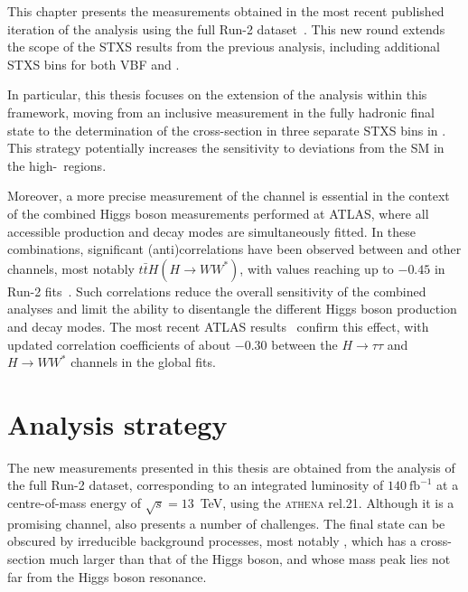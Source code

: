 This chapter presents the measurements obtained in the most recent published iteration of the \htautau analysis using the full Run-2 dataset~\cite{differential_htautau}. This new round extends the scope of the STXS results from the previous analysis, including additional STXS bins for both VBF and \ttH.  

In particular, this thesis focuses on the extension of the \ttH analysis within this framework, moving from an inclusive measurement in the fully hadronic final state to the determination of the cross-section in three separate STXS bins in \pth. This strategy potentially increases the sensitivity to deviations from the SM in the high-\pt\ regions.  

Moreover, a more precise measurement of the \ttHtt channel is essential in the context of the combined Higgs boson measurements performed at ATLAS, where all accessible production and decay modes are simultaneously fitted. In these combinations, significant (anti)correlations have been observed between \ttHtt and other channels, most notably $t\bar{t}H(H\to WW^*)$, with values reaching up to $-0.45$ in Run-2 fits~\cite{Aad_2020_combined}. Such correlations reduce the overall sensitivity of the combined analyses and limit the ability to disentangle the different Higgs boson production and decay modes. The most recent ATLAS results~\cite{ATLAS-CONF-2025-006} confirm this effect, with updated correlation coefficients of about $-0.30$ between the $H\to\tau\tau$ and $H\to WW^*$ channels in the global fits.


\section{Analysis strategy}
\label{sec:analysis_strategy}

The new measurements presented in this thesis are obtained from the analysis of the full Run-2 dataset, corresponding to an integrated luminosity of $140~\text{fb}^{-1}$ at a centre-of-mass energy of $\sqrt{s}=13$~TeV, using the \textsc{athena} rel.21. Although it is a promising channel, \htautau also presents a number of challenges. The final state can be obscured by irreducible background processes, most notably \ztautau, which has a cross-section much larger than that of the Higgs boson, and whose mass peak lies not far from the Higgs boson resonance.  

